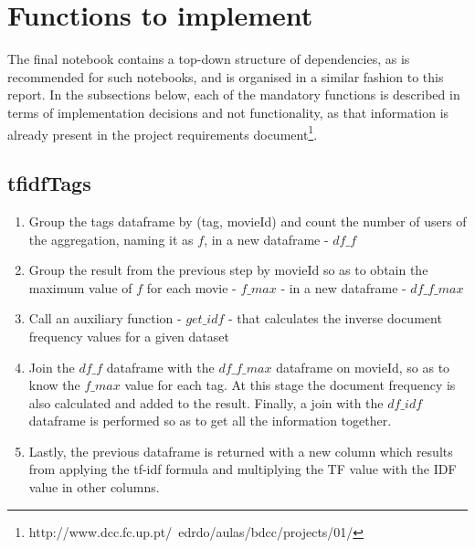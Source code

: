 \documentclass[10pt,twocolumn]{article}
\begin{document}
\section{Functions to implement}\label{sec:mandatory}
The final notebook contains a top-down structure of dependencies, as is recommended for such notebooks, and is organised in a similar fashion to this report. In the subsections below, each of the mandatory functions is described in terms of implementation decisions and not functionality, as that information is already present in the project requirements document\footnote{http://www.dcc.fc.up.pt/~edrdo/aulas/bdcc/projects/01/}. 

\subsection{tfidfTags}\label{sec:tfidfTags}
\begin{enumerate}
    \itemsep0em
    \item Group the tags dataframe by (tag, movieId) and count the number of users of the aggregation, naming it as $f$, in a new dataframe - $df\_f$
    \item Group the result from the previous step by movieId so as to obtain the maximum value of $f$ for each movie - $f\_max$ - in a new dataframe - $df\_f\_max$
    \item Call an auxiliary function - $get\_idf$ - that calculates the inverse document frequency values for a given dataset 
    \item Join the $df\_f$ dataframe with the $df\_f\_max$ dataframe on movieId, so as to know the $f\_max$ value for each tag. At this stage the document frequency is also calculated and added to the result. Finally, a join with the $df\_idf$ dataframe is performed so as to get all the information together.
    \item Lastly, the previous dataframe is returned with a new column which results from applying the tf-idf formula and multiplying the TF value with the IDF value in other columns.
\end{enumerate}
\end{document}
